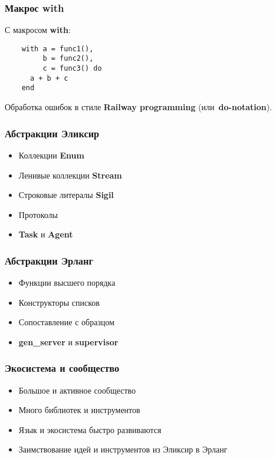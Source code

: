 \documentclass[10pt]{beamer}
\begin{document}
\begin{frame}[fragile]
  \frametitle{Макрос with}
  С макросом \textbf{with}:
  \begin{lstlisting}
    with a = func1(),
         b = func2(),
         c = func3() do
      a + b + c
    end
  \end{lstlisting}
  Обработка ошибок в стиле \textbf{Railway programming} (или~\textbf{do-notation}).
\end{frame}

\begin{frame}
  \frametitle{Абстракции Эликсир}
  \begin{itemize}
  \item Коллекции \textbf{Enum}
  \item Ленивые коллекции \textbf{Stream}
  \item Строковые литералы \textbf{Sigil}
  \item Протоколы
  \item \textbf{Task} и \textbf{Agent}
  \end{itemize}
\end{frame}

\begin{frame}
  \frametitle{Абстракции Эрланг}
  \begin{itemize}
  \item Функции высшего порядка
  \item Конструкторы списков
  \item Сопоставление с образцом
  \item \textbf{gen\_server} и \textbf{supervisor}
  \end{itemize}
\end{frame}

\begin{frame}
  \frametitle{Экосистема и сообщество}
  \begin{itemize}
  \item Большое и активное сообщество
  \item Много библиотек и инструментов
  \item Язык и экосистема быстро развиваются
  \item Заимствование идей и инструментов из Эликсир в Эрланг
  \end{itemize}
\end{frame}
\end{document}
